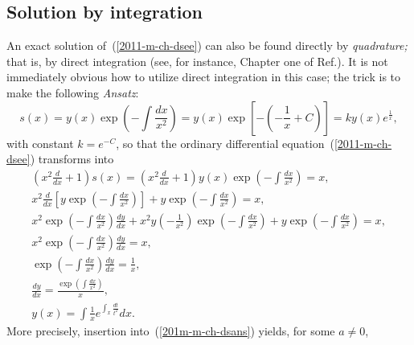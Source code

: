 \subsection*{Solution by integration}
An exact solution of~(\ref{2011-m-ch-dsee})
can also be found directly by {\em quadrature;}
that is, by direct integration (see, for instance, Chapter one of Ref.\cite[10mm]{birkhoff-Rota-48}).
It is not immediately obvious how to utilize direct integration in this case; the trick
is to make the following {\it Ansatz}:
\begin{equation}
s(x) = y (x) \exp \left( - \int \frac{ d x}{x^2} \right) = y(x)\exp \left[-\left(-\frac{1}{x}+C\right)\right]= k y(x)e^\frac{1}{x},
\label{201m-m-ch-dsans}
\end{equation}
with constant $k=e^{-C}$,
so that the ordinary differential equation~(\ref{2011-m-ch-dsee}) transforms into
\begin{equation}
\begin{split}
\left(x^2 \frac{d}{dx} +1\right)   s(x) =
\left(x^2 \frac{d}{dx} +1\right) y (x) \exp \left( - \int \frac{ d x}{x^2} \right) = x, \\
x^2 \frac{d  }{dx}\left[ y  \exp \left( - \int \frac{ d x}{x^2} \right)\right] + y  \exp \left( - \int \frac{ d x}{x^2} \right) = x, \\
x^2  \exp \left( - \int \frac{ d x}{x^2} \right)\frac{d y }{d x } + x^2 y \left(- \frac{1}{x^2}\right) \exp \left( - \int \frac{ d x}{x^2} \right) + y   \exp \left( - \int \frac{ d x}{x^2} \right) = x, \\
x^2  \exp \left( - \int \frac{ d x}{x^2} \right)\frac{d y }{d x }  = x, \\
  \exp \left( - \int \frac{ d x}{x^2} \right)\frac{d y }{d x } = \frac{1}{x}, \\
\frac{d y }{d x }  = \frac{ \exp \left( \int \frac{ d x}{x^2} \right)}{x}, \\
 y(x)  = \int \frac{1}{x} e^{ \int_x \frac{ d t}{t^2} } {d x }.
\end{split}
\end{equation}
More precisely, insertion into~(\ref{201m-m-ch-dsans}) yields, for some $a\neq 0$,
